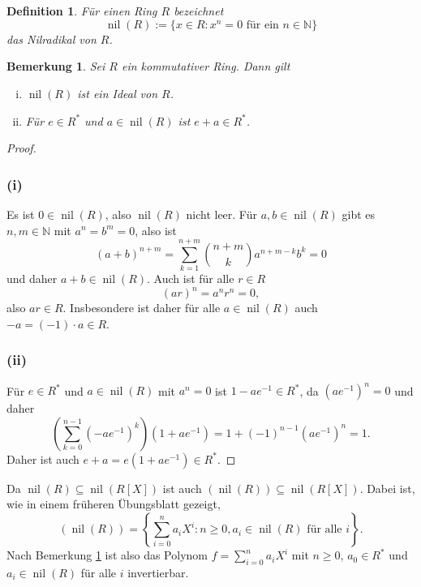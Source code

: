 \documentclass[a4paper,10pt]{article}
\newcounter{satze}
\newtheorem{bem}[satze]{Bemerkung}
\newtheorem*{defi}{Definition}
\theoremstyle{definition}
\newcommand{\N}{\mathbb{N}}
\newcommand{\nil}{\operatorname{nil}}
\begin{document}
\section{}

\begin{defi}
 Für einen Ring $R$ bezeichnet
 \[
  \nil(R) := \{x \in R : x^n = 0 \text{ für ein } n \in \N\}
 \]
 das Nilradikal von $R$.
\end{defi}

\begin{bem}\label{bem: nilradikal}
 Sei $R$ ein kommutativer Ring. Dann gilt
 \begin{enumerate}[(i)]
  \item $\nil(R)$ ist ein Ideal von $R$.
  \item Für $e \in R^*$ und $a \in \nil(R)$ ist $e+a \in R^*$.
 \end{enumerate}
\end{bem}

\begin{proof}
 \subsubsection*{(i)}
  Es ist $0 \in \nil(R)$, also $\nil(R)$ nicht leer. Für $a,b \in \nil(R)$ gibt es $n,m \in \N$ mit $a^n = b^m = 0$, also ist
  \[
   (a+b)^{n+m} = \sum_{k=1}^{n+m} \binom{n+m}{k} a^{n+m-k} b^k = 0
  \]
  und daher $a+b \in \nil(R)$. Auch ist für alle $r \in R$
  \[
   (ar)^n = a^n r^n = 0,
  \]
  also $ar \in R$. Insbesondere ist daher für alle $a \in \nil(R)$ auch $-a = (-1) \cdot a \in R$.
 \subsubsection*{(ii)}
  Für $e \in R^*$ und $a \in \nil(R)$ mit $a^n = 0$ ist $1-ae^{-1} \in R^*$, da $\left(ae^{-1}\right)^n = 0$ und daher
  \[
   \left(\sum_{k=0}^{n-1} \left(-ae^{-1}\right)^k\right) \left(1+ae^{-1}\right)
   = 1+ (-1)^{n-1} \left(ae^{-1}\right)^n
   = 1.
  \]
  Daher ist auch $e+a = e\left(1+ae^{-1}\right) \in R^*$.
\end{proof}

Da $\nil(R) \subseteq \nil(R[X])$ ist auch $\left(\nil(R)\right) \subseteq \nil(R[X])$. Dabei ist, wie in einem früheren Übungsblatt gezeigt,
\[
 \left(\nil(R)\right)
 = \left\{\sum_{i=0}^n a_i X^i : n \geq 0, a_i \in \nil(R) \text{ für alle } i\right\}.
\]
Nach Bemerkung \ref{bem: nilradikal} ist also das Polynom $f = \sum_{i=0}^n a_i X^i$ mit $n \geq 0$, $a_0 \in R^*$ und $a_i \in \nil(R)$ für alle $i$ invertierbar.
\end{document}
